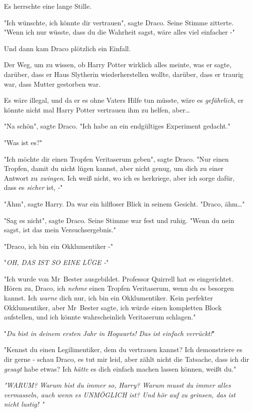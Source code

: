 {Es herrschte eine lange Stille.

"Ich wünschte, ich könnte dir vertrauen", sagte Draco. Seine Stimme zitterte. "Wenn ich nur wüsste, dass du die Wahrheit sagst, wäre alles viel einfacher -"

Und dann kam Draco plötzlich ein Einfall.

Der Weg, um zu wissen, ob Harry Potter wirklich alles meinte, was er sagte, darüber, dass er Haus Slytherin wiederherstellen wollte, darüber, dass er traurig war, dass Mutter gestorben war.

Es wäre illegal, und da er es ohne Vaters Hilfe tun müsste, wäre es \emph{gefährlich}, er könnte nicht mal Harry Potter vertrauen ihm zu helfen, aber…

"Na schön", sagte Draco. "Ich habe an ein endgültiges Experiment gedacht."

"Was ist es?"

"Ich möchte dir einen Tropfen Veritaserum geben", sagte Draco. "Nur einen Tropfen, damit du nicht lügen kannst, aber nicht genug, um dich zu einer Antwort zu \emph{zwingen}. Ich weiß nicht, wo ich es herkriege, aber ich sorge dafür, dass es \emph{sicher} ist, -"

"Ähm", sagte Harry. Da war ein hilfloser Blick in seinem Gesicht. "Draco, ähm…"

"Sag es nicht", sagte Draco. Seine Stimme war fest und ruhig. "Wenn du nein sagst, ist das mein Versuchsergebnis."

"Draco, ich bin ein Okklumentiker -"

"\emph{OH, DAS IST SO EINE LÜGE -}"

"Ich wurde von Mr~Bester ausgebildet. Professor Quirrell hat es eingerichtet. Hören zu, Draco, ich \emph{nehme} einen Tropfen Veritaserum, wenn du es besorgen kannst. Ich \emph{warne} dich nur, ich bin ein Okklumentiker. Kein perfekter Okklumentiker, aber Mr~Bester sagte, ich würde einen kompletten Block aufstellen, und ich könnte wahrscheinlich Veritaserum schlagen."

"\emph{Du bist in deinem ersten Jahr in Hogwarts! Das ist einfach verrückt!}"

"Kennst du einen Legilimentiker, dem du vertrauen kannst? Ich demonstriere es dir gerne - schau Draco, es tut mir leid, aber zählt nicht die Tatsache, dass ich dir \emph{gesagt} habe etwas? Ich \emph{hätte} es dich einfach machen lassen können, weißt du."

\emph{"WARUM? Warum bist du immer so, Harry? Warum musst du immer alles vermasseln, auch wenn es UNMÖGLICH ist? Und hör auf zu grinsen, das ist nicht lustig! "}

}

